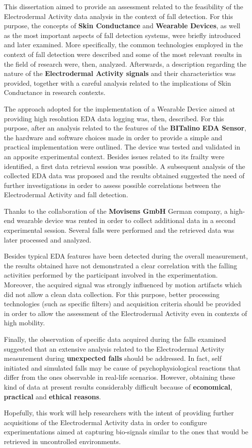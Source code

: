 \label{ch:conclusions}

This dissertation aimed to provide an assessment related to the feasibility of the Electrodermal Activity data analysis in the context of fall detection. For this purpose, the concepts of \textbf{Skin Conductance} and \textbf{Wearable Devices}, as well as the most important aspects of fall detection systems, were briefly introduced and later examined. More specifically, the common technologies employed in the context of fall detection were described and some of the most relevant results in the field of research were, then, analyzed. Afterwards, a description regarding the nature of the \textbf{Electrodermal Activity signals} and their characteristics was provided, together with a careful analysis related to the implications of Skin Conductance in research contexts.

The approach adopted for the implementation of a Wearable Device aimed at providing high resolution EDA data logging was, then, described. For this purpose, after an analysis related to the features of the \textbf{BITalino EDA Sensor}, the hardware and software choices made in order to provide a simple and practical implementation were outlined. The device was tested and validated in an apposite experimental context. Besides issues related to its frailty were identified, a first data retrieval session was possible. A subsequent analysis of the collected EDA data was proposed and the results obtained suggested the need of further investigations in order to assess possible correlations between the Electrodermal Activity and fall detection.

Thanks to the collaboration of the \textbf{Movisens GmbH} German company, a high-end wearable device was rented in order to collect additional data in a second experimental session. Several falls were performed and the retrieved data was later processed and analyzed.

Besides typical EDA features have been detected during the overall measurement, the results obtained have not demonstrated a clear correlation with the falling activities performed by the participant involved in the experimentation. Moreover, the acquired signal was strongly influenced by motion artifacts which did not allow a clean data collection. For this purpose, better processing technologies (such as specific filters) and acquisition criteria should be provided in order to allow the assessment of the Electrodermal Activity even in contexts of high mobility.

Finally, the observation of specific data acquired during the falls examined suggested that an extensive analysis related to the Electrodermal Activity measurement during \textbf{unexpected falls} should be addressed. In fact, self initiated and simulated falls may be cause of psychophysiological reactions that differ from the ones observable in real-life scenarios. However, obtaining these kind of data at present results considerably difficult because of \textbf{economical}, \textbf{practical} and \textbf{ethical reasons}.

Hopefully, this work will help researchers with the intent of providing further acquisitions of the Electrodermal Activity data in order to configure experimentations aimed at capturing bio-signals similar to the ones that would be retrieved in uncontrolled environments.



